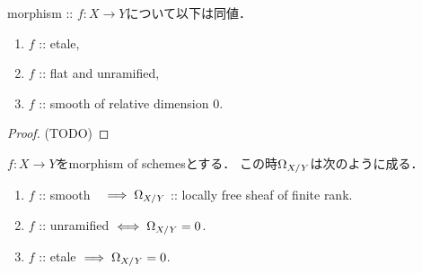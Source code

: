 \documentclass[a4paper]{jsarticle}
\begin{document}
\begin{Thm} \label{thm:etale_equiv}
    morphism :: $f \colon X \to Y$について以下は同値．
    \begin{enumerate}
        \item $f$ :: etale,
        \item $f$ :: flat and unramified, 
        \item $f$ :: smooth of relative dimension $0$.
    \end{enumerate}
\end{Thm}
\begin{proof}
    (TODO)
\end{proof}

\begin{Prop}
    $f \colon X \to Y$をmorphism of schemesとする．
    この時$\Omega_{X/Y}$は次のように成る．
\begin{enumerate}[label=(\roman*)]
    \item $f$ :: smooth \quad \ \,$\implies \Omega_{X/Y}$ :: locally free sheaf of finite rank.
    \item $f$ :: unramified $\iff \Omega_{X/Y}=0$.
    \item $f$ :: etale $\implies \Omega_{X/Y}=0$.
\end{enumerate}
\end{Prop}
\end{document}
